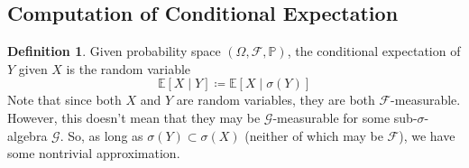 \documentclass{article}
\theoremstyle{definition}
\theoremstyle{remark}
\theoremstyle{definition}
\newtheorem{definition}{Definition}[section]
\begin{document}
\subsection{Computation of Conditional Expectation}

\begin{definition}
Given probability space $(\Omega, \mathcal{F}, \mathbb{P})$, the conditional expectation of $Y$ given $X$ is the random variable 
\[\mathbb{E}[X \mid Y] \coloneqq \mathbb{E}[X \mid \sigma(Y)]\]
Note that since both $X$ and $Y$ are random variables, they are both $\mathcal{F}$-measurable. However, this doesn't mean that they may be $\mathcal{G}$-measurable for some sub-$\sigma$-algebra $\mathcal{G}$. So, as long as $\sigma(Y) \subset \sigma(X)$ (neither of which may be $\mathcal{F}$), we have some nontrivial approximation. 
\end{definition}
\end{document}
